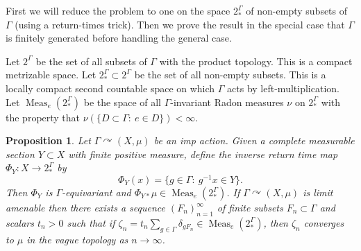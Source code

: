 \documentclass[12pt]{article}
\theoremstyle{plain}
\newtheorem{prop}[thm]{Proposition}
\theoremstyle{definition}
\theoremstyle{remark}
\newcommand{\G}{\Gamma}
\renewcommand\d{\delta}
\newcommand\Meas{{\operatorname{Meas}}}
\def\cc{{\curvearrowright}}
\begin{document}
First we will reduce the problem to one on the space $2^\G_*$ of non-empty subsets of $\G$ (using a return-times trick). Then we prove the result in the special case that $\G$ is finitely generated before handling the general case.

Let $2^\G$ be the set of all subsets of $\G$ with the product topology. This is a compact metrizable space. Let $2^\G_* \subset 2^\G$ be the set of all non-empty subsets. This is a locally compact second countable space on which $\G$ acts by left-multiplication. Let $\Meas_e(2^\G_*)$ be the space of all $\G$-invariant Radon measures $\nu$ on $2^\G_*$ with the property that $\nu(\{D\subset \G:~e \in D\})<\infty$. 

\begin{prop}\label{P:transfer-to-subsets}
    Let $\G \cc (X,\mu)$ be an imp action. Given a complete measurable section $Y \subset X$ with finite positive measure, define the inverse return time map $\Phi_Y:X \to 2^\G_*$ by
    $$\Phi_Y(x)=\{g \in \G:~ g^{-1}x \in Y\}.$$
    Then $\Phi_Y$ is $\G$-equivariant and $\Phi_{Y*}\mu \in \Meas_e(2^\G_*)$. If $\G \cc (X,\mu)$ is limit amenable then there exists a sequence $(F_n)_{n=1}^\infty$ of finite subsets $F_n \subset \G$ and scalars $t_n>0$ such that if $\zeta_n = t_n \sum_{g\in \G} \d_{gF_n} \in \Meas_e(2^\G_*)$, then $\zeta_n$ converges to $\mu$ in the vague topology as $n\to\infty$.
\end{prop}
\end{document}
